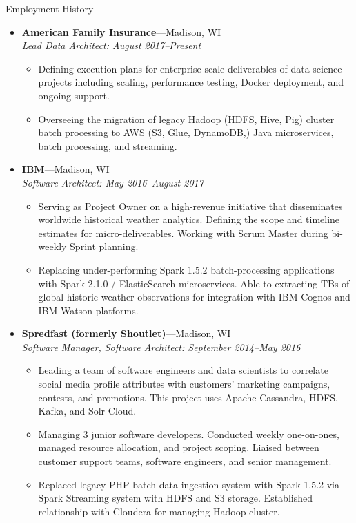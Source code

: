 \documentclass[11pt,oneside]{article}
\newenvironment{ressectionx}[1]{
	\vspace{4pt}
	{\fontfamily{phv}\selectfont\Large#1}
	\begin{itemize}[label={}]
	\vspace{3pt}
}{
	\end{itemize}
}
\newcommand{\ressubitem}[1]{
	\vspace{-1pt}
	\item \begin{flushleft} #1 \end{flushleft}
}
\newcommand{\resbigitem}[3]{
	\vspace{-5pt}
	\item
	\textbf{#1}---#2 \\
	\textit{#3}
}
\newenvironment{ressubsec}[3]{
	\resbigitem{#1}{#2}{#3}
	\vspace{-2pt}
	\begin{itemize}
}{
	\end{itemize}
}
\begin{document}
\begin{ressectionx}{Employment History}

\begin{ressubsec}{American Family Insurance}{Madison, WI}{Lead Data Architect: August 2017--Present}
		\ressubitem{Defining execution plans for enterprise scale deliverables of data science projects including scaling, performance testing, Docker deployment, and ongoing support.}
	\ressubitem{Overseeing the migration of legacy Hadoop (HDFS, Hive, Pig) cluster batch processing to AWS (S3, Glue, DynamoDB,) Java microservices, batch processing, and streaming.}	
	\end{ressubsec}


\begin{ressubsec}{IBM}{Madison, WI}{Software Architect: May 2016--August 2017}
		\ressubitem{Serving as Project Owner on a high-revenue initiative that disseminates worldwide historical weather analytics. Defining the scope and timeline estimates for micro-deliverables. Working with Scrum Master during bi-weekly Sprint planning.}
		\ressubitem{Replacing under-performing Spark 1.5.2 batch-processing applications with Spark 2.1.0 / ElasticSearch microservices. Able to extracting TBs of global historic weather observations for integration with IBM Cognos and IBM Watson platforms.}	
	\end{ressubsec}

\begin{ressubsec}{Spredfast (formerly Shoutlet)}{Madison, WI}{Software Manager, Software Architect: September 2014--May 2016}
		\ressubitem{Leading a team of software engineers and data scientists to correlate social media profile attributes with customers' marketing campaigns, contests, and promotions. This project uses Apache Cassandra, HDFS, Kafka, and Solr Cloud.}
		\ressubitem{Managing 3 junior software developers. Conducted weekly one-on-ones, managed resource allocation, and project scoping. Liaised between customer support teams, software engineers, and senior management.}
	\ressubitem{Replaced legacy PHP batch data ingestion system with Spark 1.5.2 via Spark Streaming system with HDFS and S3 storage. Established relationship with Cloudera for managing Hadoop cluster.}


\end{ressubsec}
\end{ressectionx}
\end{document}
